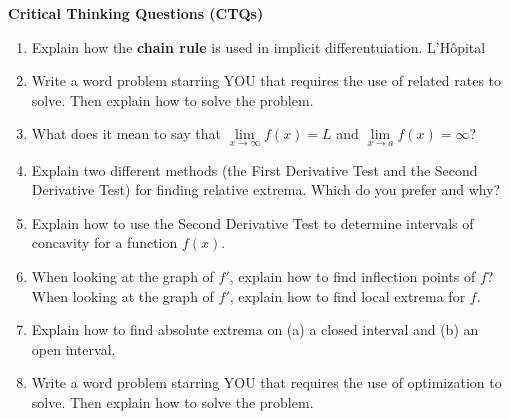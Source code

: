 \documentclass[12pt]{article}
\begin{document}
\textbf{Critical Thinking Questions (CTQs)}

\begin{enumerate}
\setlength\itemsep{1em}
\item Explain how the \textbf{chain rule} is used in implicit differentuiation.  L'H\^{o}pital
\item Write a word problem starring YOU that requires the use of related rates to solve. Then explain how to solve the problem. 
\item What does it mean to say that $\lim\limits_{x \to \infty}f(x)=L$ and $\lim\limits_{x \to a}f(x)=\infty$?
\item Explain two different methods (the First Derivative Test and the Second Derivative Test) for finding relative extrema. Which do you prefer and why?
\item Explain how to use the Second Derivative Test to determine intervals of concavity for a function $f(x)$.
\item When looking at the graph of $f'$, explain how to find inflection points of $f$? When looking at the graph of $f'$, explain how to find local extrema for $f$.
\item Explain how to find absolute extrema on (a) a closed interval and (b) an open interval.
\item Write a word problem starring YOU that requires the use of optimization to solve. Then explain how to solve the problem.
\end{enumerate}
\end{document}
